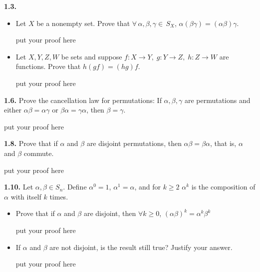 \documentclass[12pt]{article}
\begin{document}
\textbf{1.3.}
\begin{itemize}
	\item Let $X$ be a nonempty set. Prove that $\forall\, \alpha, \beta, \gamma\in \, S_X$, $\alpha(\beta\gamma)=(\alpha\beta)\gamma$.
	\bigskip

	put your proof here

	\vspace{1in}

	\item Let $X,Y,Z,W$ be sets and suppose $f:X\to Y,\; g:Y\to Z,\; h:Z\to W$ are functions. Prove that $h(gf)=(hg)f$.

		\bigskip

	put your proof here

	\vspace{1in}

\end{itemize}

\textbf{1.6.}  Prove the cancellation law for permutations: If $\alpha, \beta, \gamma$ are permutations and either $\alpha\beta=\alpha\gamma$ or $\beta\alpha=\gamma\alpha$, then $\beta=\gamma$.

	\bigskip

	put your proof here

	\vspace{1in}

\textbf{1.8.} Prove that if $\alpha$ and $\beta$ are disjoint permutations, then $\alpha\beta=\beta\alpha$, that is, $\alpha$ and $\beta$ commute.

\bigskip

	put your proof here

	\vspace{1in}

\textbf{1.10.} Let $\alpha, \beta\in S_n$. Define $\alpha^0=1$, $\alpha^1=\alpha$, and for $k\ge 2$ $\alpha^k$ is the composition of $\alpha$ with itself $k$ times.

\begin{itemize}
	\item Prove that if $\alpha$ and $\beta$ are disjoint, then $\forall k\ge0$, $(\alpha\beta)^k=\alpha^k\beta^k$

	\bigskip

	put your proof here

	\vspace{1in}

\item If $\alpha$ and $\beta$ are not disjoint, is the result still true? Justify your answer.

	\bigskip

	put your proof here

	\vspace{1in}

\end{itemize}
\end{document}
